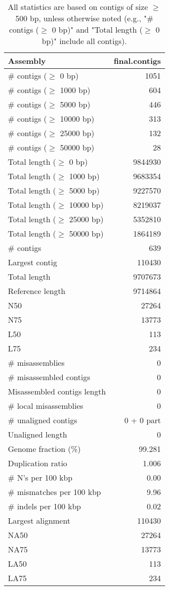 \documentclass[12pt,a4paper]{article}
\begin{document}
\begin{table}[ht]
\begin{center}
\caption{All statistics are based on contigs of size $\geq$ 500 bp, unless otherwise noted (e.g., "\# contigs ($\geq$ 0 bp)" and "Total length ($\geq$ 0 bp)" include all contigs).}
\begin{tabular}{|l*{1}{|r}|}
\hline
Assembly & final.contigs \\ \hline
\# contigs ($\geq$ 0 bp) & 1051 \\ \hline
\# contigs ($\geq$ 1000 bp) & 604 \\ \hline
\# contigs ($\geq$ 5000 bp) & 446 \\ \hline
\# contigs ($\geq$ 10000 bp) & 313 \\ \hline
\# contigs ($\geq$ 25000 bp) & 132 \\ \hline
\# contigs ($\geq$ 50000 bp) & 28 \\ \hline
Total length ($\geq$ 0 bp) & 9844930 \\ \hline
Total length ($\geq$ 1000 bp) & 9683354 \\ \hline
Total length ($\geq$ 5000 bp) & 9227570 \\ \hline
Total length ($\geq$ 10000 bp) & 8219037 \\ \hline
Total length ($\geq$ 25000 bp) & 5352810 \\ \hline
Total length ($\geq$ 50000 bp) & 1864189 \\ \hline
\# contigs & 639 \\ \hline
Largest contig & 110430 \\ \hline
Total length & 9707673 \\ \hline
Reference length & 9714864 \\ \hline
N50 & 27264 \\ \hline
N75 & 13773 \\ \hline
L50 & 113 \\ \hline
L75 & 234 \\ \hline
\# misassemblies & 0 \\ \hline
\# misassembled contigs & 0 \\ \hline
Misassembled contigs length & 0 \\ \hline
\# local misassemblies & 0 \\ \hline
\# unaligned contigs & 0 + 0 part \\ \hline
Unaligned length & 0 \\ \hline
Genome fraction (\%) & 99.281 \\ \hline
Duplication ratio & 1.006 \\ \hline
\# N's per 100 kbp & 0.00 \\ \hline
\# mismatches per 100 kbp & 9.96 \\ \hline
\# indels per 100 kbp & 0.02 \\ \hline
Largest alignment & 110430 \\ \hline
NA50 & 27264 \\ \hline
NA75 & 13773 \\ \hline
LA50 & 113 \\ \hline
LA75 & 234 \\ \hline
\end{tabular}
\end{center}
\end{table}
\end{document}
